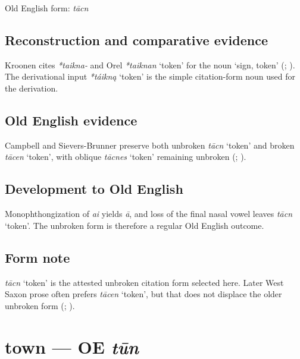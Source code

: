 \documentclass[
  british,
  a4paper,
  openany]{book}
\providecommand{\Recon}[1]{\emph{*#1}}
{\catcode`→=\active \global\def→{\ensuremath{\rightarrow}}}
\providecommand{\texorpdfstring}[2]{#1}
\providecommand{\Recon}[1]{\emph{*#1}}
{\catcode`→=\active \global\def→{\ensuremath{\rightarrow}}}
\begin{document}
Old English form: \emph{tācn}

\subsection{Reconstruction and comparative
evidence}\label{reconstruction-and-comparative-evidence-58}

Kroonen cites \emph{*taikna-} and Orel \Recon{taiknan} `token' for the
noun `sign, token' (;
). The derivational input
\Recon{táikną} `token' is the simple citation-form noun used for the
derivation.

\subsection{Old English evidence}\label{old-english-evidence-58}

Campbell and Sievers-Brunner preserve both unbroken \emph{tācn} `token'
and broken \emph{tācen} `token', with oblique \emph{tācnes} `token'
remaining unbroken (;
).

\subsection{Development to Old
English}\label{development-to-old-english-58}

Monophthongization of \emph{ai} yields \emph{ā}, and loss of the final
nasal vowel leaves \emph{tācn} `token'. The unbroken form is therefore a
regular Old English outcome.

\subsection{Form note}\label{form-note-23}

\emph{tācn} `token' is the attested unbroken citation form selected
here. Later West Saxon prose often prefers \emph{tācen} `token', but
that does not displace the older unbroken form
(;
).

\section{\texorpdfstring{town --- OE
\emph{tūn}}{town --- OE tūn}}\label{town-oe-tux16bn}
\end{document}
